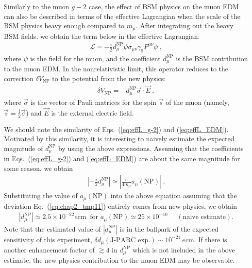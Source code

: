 Similarly to the muon $g-2$ case, the effect of BSM physics
on the muon EDM can also be described in terms of the effective
Lagrangian when the scale of the BSM physics heavy enough
compared to $m_\mu$.
After integrating out the heavy BSM fields,
we obtain the term below in the effective Lagrangian:
%
\begin{align}
 {\mathcal L} = - \frac{i}{2} d_\mu^{\text{NP}}
 \overline{\psi} \sigma_{\mu\nu} \gamma_5 F^{\mu\nu} \psi ~,
\label{eq:effL_EDM}
\end{align}
%
where $\psi$ is the field for the muon, and the coefficient
$d_\mu^{\text{NP}}$ is the BSM contribution to the muon EDM.
In the nonrelativistic limit, this operator reduces to the
correction $\delta V_{\text{NP}}$
to the potential from the new physics:
%
\begin{align}
 \delta V_{\text{NP}} 
  = - d_\mu^{\text{NP}} \vec{\sigma} \cdot \vec{E}~,
\end{align}
%
where $\vec{\sigma}$ is the vector of Pauli matrices
for the spin $\vec{s}$ of the muon (namely, 
$\vec{s}= \frac12 \vec{\sigma}$) and $\vec{E}$ is
the external electric field. 

We should note the similarity of Eqs.~(\ref{eq:effL_g-2}) 
and (\ref{eq:effL_EDM}).  Motivated by this similarity, it 
is interesting to naively estimate the expected magnitude
of $d_\mu^{\text{NP}}$ by using the above expressions.
Assuming that the coefficients in Eqs.~(\ref{eq:effL_g-2}) 
and (\ref{eq:effL_EDM}) are about the same magnitude for
some reason, we obtain
%
\begin{align}
  \left| - \frac{i}{2} d_\mu^{\text{NP}} \right| \simeq 
   \left| \frac{e}{4m_\mu} a_\mu(\text{NP}) \right|~.
\end{align}
%
Substituting the value of $a_\mu(\text{NP})$ into
the above equation assuming that the deviation 
Eq.~(\ref{eq:chap2_tmp11}) entirely comes from new physics,
we obtain
%
\begin{align}
 |d_\mu^{\text{NP}}| \simeq 2.5 \times 10^{-22} e {\text{cm}}~
\text{ for } 
 a_\mu({\text{NP}}) \simeq 25 \times 10^{-10} 
~~~~~~(\text{naive estimate}).
\end{align}
%
Note that the estimated value of $|d_\mu^{\text{NP}}|$ is
in the ballpark of the expected sensitivity of this experiment,
$\delta d_\mu(\text{J-PARC exp.}) \sim 10^{-21} ~ e {\text{cm}}$.
If there is another enhancement factor of $\gtrsim 4$
in $d_\mu^{\text{NP}}$ which is not included in the above estimate,
the new physics contribution to the muon EDM may be observable.

